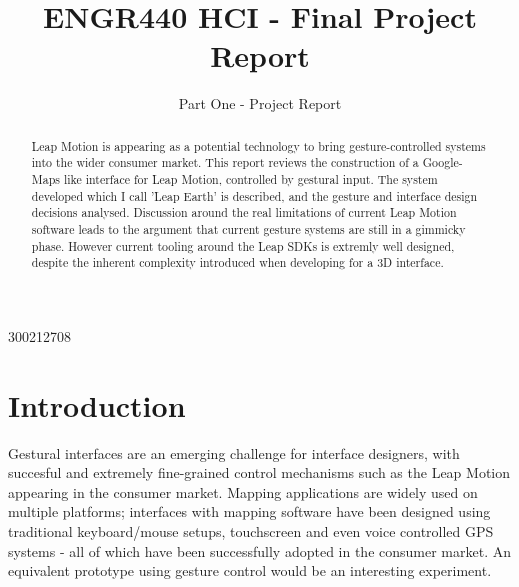 \documentclass{sigplanconf}
\begin{document}
\setlength{\pdfpageheight}{\paperheight}
\setlength{\pdfpagewidth}{\paperwidth}



\title{ENGR440 HCI - Final Project Report}
\subtitle{Part One - Project Report}

           {300212708}      


\maketitle

\begin{abstract}

Leap Motion is appearing as a potential technology to bring gesture-controlled systems into the wider consumer market. This report reviews the construction of a Google-Maps like interface for Leap Motion, controlled by gestural input. The system developed which I call 'Leap Earth' is described, and the gesture and interface design decisions analysed. Discussion around the real limitations of current Leap Motion software leads to the argument that current gesture systems are still in a gimmicky phase. However current tooling around the Leap SDKs is extremly well designed, despite the inherent complexity introduced when developing for a 3D interface.

\end{abstract}

\section{Introduction}

Gestural interfaces are an emerging challenge for interface designers, with succesful and extremely fine-grained control mechanisms such as the Leap Motion appearing in the consumer market. Mapping applications are widely used on multiple platforms; interfaces with mapping software have been designed using traditional keyboard/mouse setups, touchscreen and even voice controlled GPS systems - all of which have been successfully adopted in the consumer market. An equivalent prototype using gesture control would be an interesting experiment.
\end{document}
